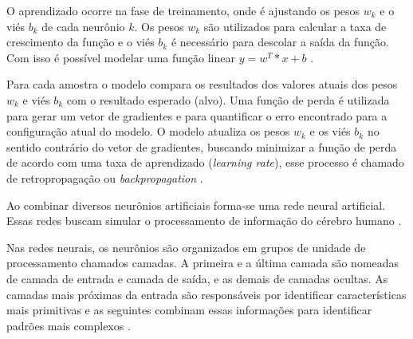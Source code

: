 O aprendizado ocorre na fase de treinamento, onde é ajustando os pesos $w_k$ e o viés $b_k$ de cada neurônio $k$. Os pesos $w_k$ são utilizados para calcular a taxa de crescimento da função e o viés $b_k$ é necessário para descolar a saída da função. Com isso é possível modelar uma função linear $y=w^T*x+b$ \space\cite{marti2017aprendizado}.

Para cada amostra o modelo compara os resultados dos valores atuais dos pesos $w_k$ e viés $b_k$ com o resultado esperado (alvo). Uma função de perda é utilizada para gerar um vetor de gradientes e para quantificar o erro encontrado para a configuração atual do modelo. O modelo atualiza os pesos $w_k$ e os viés $b_k$ no sentido contrário do vetor de gradientes, buscando minimizar a função de perda de acordo com uma taxa de aprendizado (\textit{learning rate}), esse processo é chamado de retropropagação ou \textit{backpropagation} \space\cite{marti2017aprendizado}.

Ao combinar diversos neurônios artificiais forma-se uma rede neural artificial. Essas redes buscam simular o processamento de informação do cérebro humano \space\cite{ferneda2006redes}.

Nas redes neurais, os neurônios são organizados em grupos de unidade de processamento chamados camadas. A primeira e a última camada são nomeadas de camada de entrada e camada de saída, e as demais de camadas ocultas. As camadas mais próximas da entrada são responsáveis por identificar características mais primitivas e as seguintes combinam essas informações para identificar padrões mais complexos \space\cite{marti2017aprendizado}.
